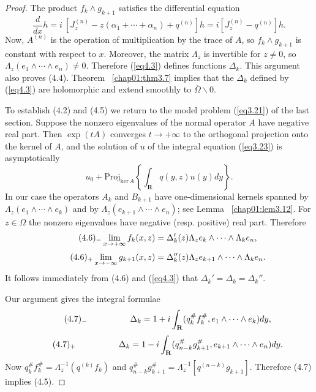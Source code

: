 \documentclass{surv-l}
\theoremstyle{plain}
\theoremstyle{definition}
\numberwithin{equation}{chapter}
\begin{document}
\begin{proof}
The product $f_{k}\wedge g_{k+1}$ satisfies the differential equation
\begin{equation*}
\frac{d}{dx}h=i\ [J_{z}^{(n)}-z(\alpha_{1}+\cdots +\alpha_{n})+q^{(n)}]h=i[J_{z}^{(n)}-q^{(n)}]h.
\end{equation*}
Now, $A^{(n)}$ is the operation of multiplication by the trace of $A$, so $f_{k}\wedge g_{k+1}$ is constant with respect to $x$. Moreover, the matrix $\Lambda_{z}$ is invertible for $z\neq 0$, so $\Lambda_{z}(e_{1}\wedge\cdots \wedge e_{n})\neq 0$. Therefore (\ref{eq4.3}) defines functions $\Delta_{k}$. This argument also proves (4.4). Theorem ~\ref{chap01:thm3.7} implies that the $\Delta_{k}$ defined by (\ref{eq4.3}) are holomorphic and extend smoothly to $\overline{\Omega}\backslash 0$.

To establish (4.2) and (4.5) we return to the model problem (\ref{eq3.21}) of the last section. Suppose the nonzero eigenvalues of the normal operator $A$ have negative real part. Then $\exp(tA)$ converges $ t\rightarrow+\infty$ to the orthogonal projection onto the kernel of $A$, and the solution of $u$ of the integral equation (\ref{eq3.23}) is asymptotically
\begin{equation*}
u_{0}+\mathrm{Proj}_{\mathrm{ker}\,A}\left\{\int_{\mathbf{R}}q(y, z)u(y)dy\right\}.
\end{equation*}
In our case the operators $A_{k}$ and $B_{k+1}$ have one-dimensional kernels spanned by $\Lambda_{z}(e_{1}\wedge\cdots\wedge e_{k})$ and by $\Lambda_{z}(e_{k+1}\wedge\cdots\wedge e_{n})$; see Lemma ~\ref{chap01:lem3.12}. For $ z\in\Omega$ the nonzero eigenvalues have negative (resp. positive) real part. Therefore
\begin{equation*}
\tag*{$(4.6)_{-}$} \displaystyle \lim_{x\rightarrow+\infty}  f_{k}(x, z)=\Delta_{k}'(z)\Lambda_{z}e_{k}\wedge\cdots\wedge\Lambda_{k}e_{n},
\end{equation*}
\begin{equation*}
\tag*{$(4.6)_{+}$} \displaystyle \lim_{x\rightarrow-\infty} g_{k+1}(x, z)=\Delta_{k}''(z)\Lambda_{z}e_{k+1}\wedge\cdots\wedge\Lambda_{k}e_{n}.
\end{equation*}
It follows immediately from (4.6) and (\ref{eq4.3}) that $\Delta_{k}'=\Delta_{k}=\Delta_{k}''$.

Our argument gives the integral formulae
\begin{equation*}
\tag*{$(4.7)_{-}$}\qquad \qquad \quad \displaystyle \Delta_{k}=1+i\int_{\mathbf{R}}(q_{k}^{\#}f_{k}^{\#}, e_{1}\wedge\cdots\wedge e_{k}) dy,
\end{equation*}
\begin{equation*}
\tag*{$(4.7)_{+}$} \qquad \qquad \quad \displaystyle \Delta_{k}=1-i\int_{\mathbf{R}}(q_{n-k}^{\#}g_{k+1}^{\#},e_{k+1}\wedge\cdots\wedge e_{n}) dy.
\end{equation*}
Now $q_{k}^{\#}f_{k}^{\#}=\Lambda_{z}^{-1}(q^{(k)}f_{k})$ and $q_{n-k}^{\#}g_{k+1}^{\#}=\Lambda_{z}^{-1}[q^{(n-k)}g_{k+1}]$. Therefore (4.7) implies (4.5).
\end{proof}
\end{document}
